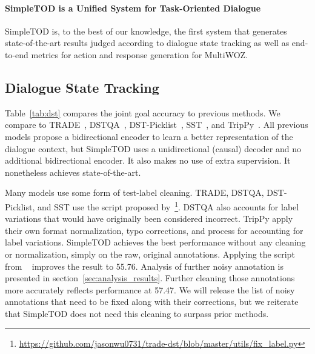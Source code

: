 \documentclass{article}
\begin{document}
\paragraph{SimpleTOD is a Unified System for Task-Oriented Dialogue} 
SimpleTOD is, to the best of our knowledge, the first system that generates state-of-the-art results judged according to dialogue state tracking as well as end-to-end metrics for action and response generation for MultiWOZ.


\subsection{Dialogue State Tracking}
\label{ssec:bst}
Table~\ref{tab:dst} compares the joint goal accuracy to previous methods.
We compare to TRADE~\citep{trade2019wu}, DSTQA~\citep{zhou2019multi}, DST-Picklist~\citep{zhang2019find}, SST~\citep{schema2020chen}, and TripPy~\cite{heck2020trippy}.
All previous models propose a bidirectional encoder to learn a better representation of the dialogue context, 
but SimpleTOD uses a unidirectional (causal) decoder and no additional bidirectional encoder.
It also makes no use of extra supervision.
It nonetheless achieves state-of-the-art. 

Many models use some form of test-label cleaning.
TRADE, DSTQA, DST-Picklist, and SST use the script proposed by~\citet{trade2019wu}\footnote{\url{https://github.com/jasonwu0731/trade-dst/blob/master/utils/fix\_label.py}}.
DSTQA also accounts for label variations that would have originally been considered incorrect.
TripPy apply their own format normalization, typo corrections, and process for accounting for label variations.
SimpleTOD achieves the best performance without any cleaning or normalization, simply on the raw, original annotations. 
Applying the script from ~\citet{trade2019wu} improves the result to 55.76.
Analysis of further noisy annotation is presented in section~\ref{sec:analysis_results}.
Further cleaning those annotations more accurately reflects performance at 57.47.
We will release the list of noisy annotations that need to be fixed along with their corrections, but we reiterate that SimpleTOD does not need this cleaning to surpass prior methods.
\end{document}
